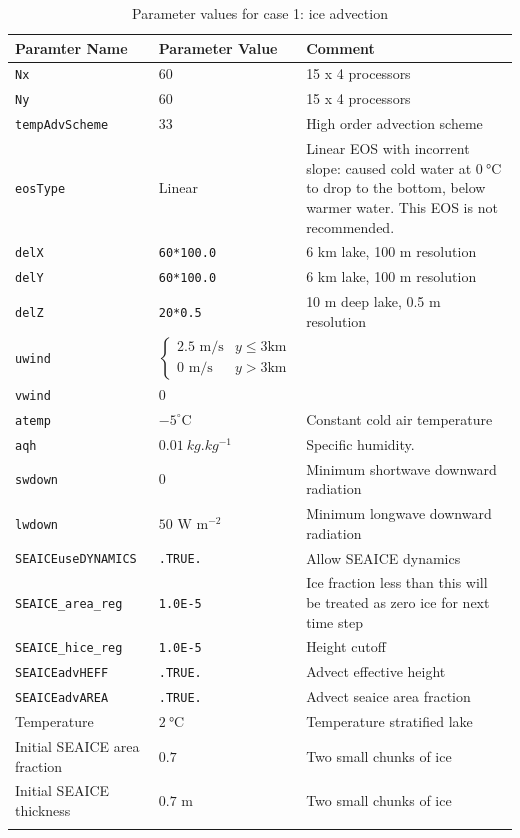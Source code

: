 \documentclass[11pt]{article}
\begin{document}
\begin{longtable}{  p{}  p{}  p{}  }
\hline
\textbf{Paramter Name} & \textbf{Parameter Value} & \textbf{Comment} \\ \hline \hline
\verb|Nx| & 60 & 15 x 4 processors \\ \hline
\verb|Ny| & 60 & 15 x 4 processors \\ \hline
\verb|tempAdvScheme|	&	33	&	High order advection scheme \\ \hline
\verb|eosType|		&	Linear	&	Linear EOS with incorrent slope: caused cold water at $\SI{0}{\celsius}$ to drop to the bottom, below warmer water. This EOS is not recommended. \\ \hline
\verb|delX|			&	\verb|60*100.0|	&	6 km lake, 100 m resolution \\ \hline
\verb|delY|			&	\verb|60*100.0|	&	6 km lake, 100 m resolution \\ \hline
\verb|delZ|			&	\verb|20*0.5|	&	10 m deep lake, 0.5 m resolution \\ \hline

\verb|uwind|		&	\begin{equation*} \begin{cases} 2.5 \text{ m/s} & y \leq 3 \text{km} \\ 0 \text{ m/s} & y > 3 \text{km}   \end{cases} \end{equation*} & \\ \hline
\verb|vwind| 	& 0	& \\ \hline
\verb|atemp| 	& $-5^{\circ} \text{C}$		& Constant cold air temperature \\ \hline
\verb|aqh| 		& $\SI{0.01}{kg.kg^{-1}}$		&	Specific humidity.\\ \hline
\verb|swdown| 	& $0$	& Minimum shortwave downward radiation \\ \hline
\verb|lwdown| 	& $50 \text{ W} \text{ m}^{-2}$	& Minimum longwave downward radiation \\ \hline

\verb|SEAICEuseDYNAMICS| & \verb|.TRUE.| & Allow SEAICE dynamics \\ \hline
\verb|SEAICE_area_reg|   & \verb|1.0E-5| & Ice fraction less than this will be treated as zero ice for next time step \\ \hline
\verb|SEAICE_hice_reg|   & \verb|1.0E-5| & Height cutoff \\ \hline
\verb|SEAICEadvHEFF|     & \verb|.TRUE.| & Advect effective height \\ \hline
\verb|SEAICEadvAREA|     & \verb|.TRUE.| & Advect seaice area fraction \\ \hline

Temperature & $\SI{2}{\celsius}$ & Temperature stratified lake \\ \hline
Initial SEAICE area fraction   & $0.7$ & Two small chunks of ice \\ \hline
Initial SEAICE thickness    & $0.7 \text{ m}$ & Two small chunks of ice \\ \hline

\caption{Parameter values for case 1: ice advection}
\label{table:iceAdvect}
\end{longtable}
\end{document}
